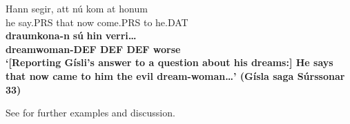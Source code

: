 
\ea\label{}
\gll Hann  segir,  att  nú  kom  at  honum\\
he  say.PRS   that  now  come.PRS  to  he.DAT\\
\gll \textbf{draumkona}\textbf{{}-n}\textbf{  sú} \textbf{hin} \textbf{verri…}\\
\bfseries dreamwoman-DEF  DEF  DEF  worse\\
\glt ‘[Reporting Gísli’s answer to a question about his dreams:] He says that now came to him the evil dream-woman…’ (Gísla saga Súrssonar 33)
\z

 See \citet{Dahl2003} for further examples and discussion.


